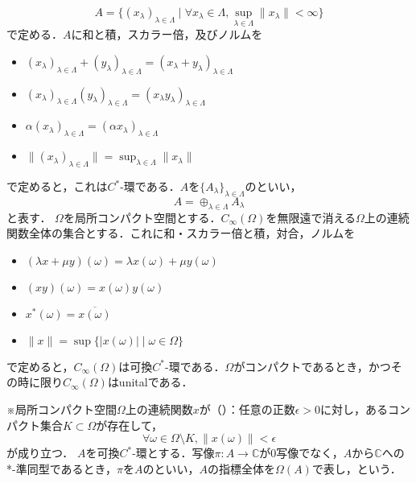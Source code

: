 \[A=\{ \left( x_{\lambda}\right)_{\lambda \in \Lambda}\mid\forall x_{\lambda}\in \Lambda ,
\sup_{\lambda \in \Lambda}\lVert x_{\lambda}\rVert <\infty  \}\]
で定める．$A$に和と積，スカラー倍，及びノルムを
\begin{itemize}
\item $\left( x_{\lambda}\right)_{\lambda \in \Lambda}+\left( y_{\lambda}\right)_{\lambda \in \Lambda}
=\left( x_{\lambda}+y_{\lambda}\right)_{\lambda \in \Lambda}$
\item $\left( x_{\lambda}\right)_{\lambda \in \Lambda}\left( y_{\lambda}\right)_{\lambda \in \Lambda}
=\left( x_{\lambda}y_{\lambda}\right)_{\lambda \in \Lambda}$
\item $\alpha \left( x_{\lambda}\right)_{\lambda \in \Lambda}=\left( \alpha x_{\lambda}\right)_{\lambda \in \Lambda}$
\item $\lVert \left( x_{\lambda}\right)_{\lambda \in \Lambda}\rVert=\sup_{\lambda \in \Lambda}\lVert x_{\lambda}\rVert$
\end{itemize}
で定めると，これは$C^*$-環である．$A$を$\{A_{\lambda}\}_{\lambda \in \Lambda}$のといい，
\[A=\oplus_{\lambda \in \Lambda} A_{\lambda}\]
と表す．
$\Omega$を局所コンパクト空間とする．$C_{\infty}\left( \Omega\right)$を無限遠で消える$\Omega$上の連続関数全体の集合とする．これに和・スカラー倍と積，対合，ノルムを
\begin{itemize}
\item $\left(\lambda x+\mu y\right)\left(\omega\right)=\lambda x\left(\omega\right)+\mu y\left(\omega\right)$
\item $\left(xy\right)\left(\omega\right)=x\left(\omega\right)y\left(\omega\right)$
\item $x^*\left(\omega\right)=\overline{x\left(\omega\right)}$
\item $\lVert x\rVert=\sup\{|x\left(\omega\right)|\mid\omega \in \Omega\}$
\end{itemize}
で定めると，$C_{\infty}(\Omega)$は可換$C^*$-環である．$\Omega$がコンパクトであるとき，かつその時に限り$C_{\infty}(\Omega)$はunitalである．

※局所コンパクト空間$\Omega$上の連続関数$x$が（）：任意の正数$\epsilon >0$に対し，あるコンパクト集合$K\subset \Omega$が存在して，
\[\forall \omega \in \Omega\setminus K,\lVert x(\omega)\rVert<\epsilon\]
が成り立つ．
$A$を可換$C^*$-環とする．写像$\pi:A\rightarrow\mathbb{C}$が0写像でなく，$A$から$\mathbb{C}$への *-準同型であるとき，$\pi$を$A$のといい，$A$の指標全体を$\Omega\left(A\right)$で表し，という．

